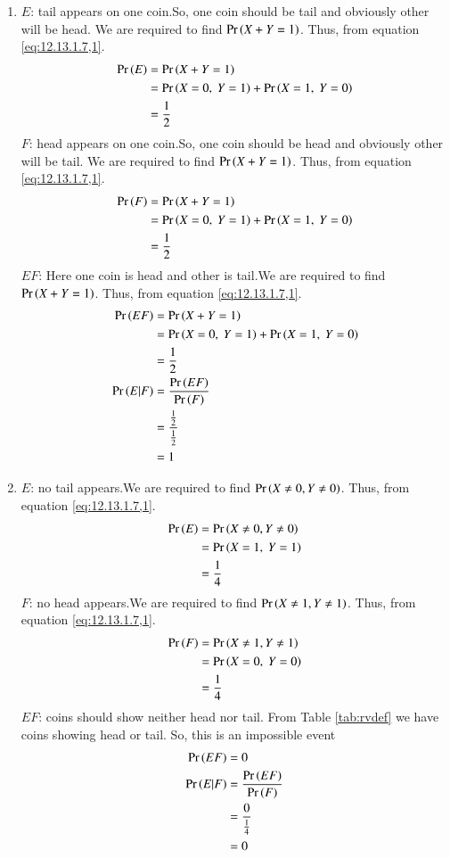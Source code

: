 \documentclass[journal,11pt,twocolumn]{IEEEtran}
\begin{document}
    \begin{enumerate}
        \item $E$: tail appears on one coin.So, one coin should be tail and obviously other will be head. We are required to find $\Pr\left(X+Y=1\right)$. Thus, from equation \eqref{eq:12.13.1.7,1}.
        \begin{align}
        \Pr\left(E\right)&=\Pr\left(X+Y=1\right)\\
        &=\Pr\left(X=0,\ Y=1\right)+\Pr\left(X=1,\ Y=0\right)\\
        &=\frac{1}{2}
        \end{align}
        $F$: head appears on one coin.So, one coin should be head and obviously other will be tail. We are required to find $\Pr\left(X+Y=1\right)$. Thus, from equation \eqref{eq:12.13.1.7,1}.
        \begin{align}
        \Pr\left(F\right)&=\Pr\left(X+Y=1\right)\\
        &=\Pr\left(X=0,\ Y=1\right)+\Pr\left(X=1,\ Y=0\right)\\
        &=\frac{1}{2}
        \end{align}
  	$EF$: Here one coin is head and other is tail.We are required to find $\Pr\left(X+Y=1\right)$. Thus, from equation \eqref{eq:12.13.1.7,1}.
\begin{align}
        \Pr\left(EF\right)&=\Pr\left(X+Y=1\right)\\
        &=\Pr\left(X=0,\ Y=1\right)+\Pr\left(X=1,\ Y=0\right)\\
        &=\frac{1}{2}\\
        \Pr\left(E|F\right)&=\frac{\Pr\left(EF\right)}{\Pr\left(F\right)}\\
        &=\frac{\frac{1}{2}}{\frac{1}{2}}\\
        &=1
\end{align}
\item $E$: no tail appears.We are required to find $\Pr\left(X\neq0,Y\neq0\right)$. Thus, from equation \eqref{eq:12.13.1.7,1}.
\begin{align}
\Pr\left(E\right)&=\Pr\left(X\neq0,Y\neq0\right)\\
&=\Pr\left(X=1,\ Y=1\right)\\
&=\frac{1}{4}
        \end{align}
        $F$: no head appears.We are required to find $\Pr\left(X\neq1,Y\neq1\right)$. Thus, from equation \eqref{eq:12.13.1.7,1}.
        \begin{align}
        \Pr\left(F\right)&=\Pr\left(X\neq1,Y\neq1\right)\\
        &=\Pr\left(X=0,\ Y=0\right)\\
        &=\frac{1}{4}
\end{align}
$EF$: coins should show neither head nor tail. From Table \ref{tab:rvdef} we have coins showing head or tail. So, this is an impossible event
\begin{align}
\Pr\left(EF\right)&=0\\
\Pr\left(E|F\right)&=\frac{\Pr\left(EF\right)}{\Pr\left(F\right)}\\
&=\frac{0}{\frac{1}{4}}\\
&=0
\end{align}
        
        
     
    \end{enumerate}
\end{document}
